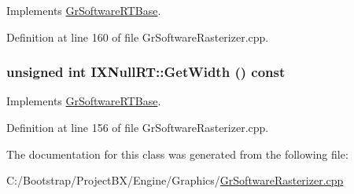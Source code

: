 Implements \hyperlink{class_gr_software_r_t_base_9ed681a9c06bd9657f75e7590bfee5ac}{GrSoftwareRTBase}.

Definition at line 160 of file GrSoftwareRasterizer.cpp.\hypertarget{class_i_x_null_r_t_f4d16738ce92117b4417835a826b88d8}{
\subsubsection[{GetWidth}]{\setlength{\rightskip}{0pt plus 5cm}unsigned int IXNullRT::GetWidth () const}}
\label{class_i_x_null_r_t_f4d16738ce92117b4417835a826b88d8}




Implements \hyperlink{class_gr_software_r_t_base_f1b868a5ca1e7444a44c280e76bd802d}{GrSoftwareRTBase}.

Definition at line 156 of file GrSoftwareRasterizer.cpp.

The documentation for this class was generated from the following file:\begin{CompactItemize}
\item 
C:/Bootstrap/ProjectBX/Engine/Graphics/\hyperlink{_gr_software_rasterizer_8cpp}{GrSoftwareRasterizer.cpp}\end{CompactItemize}
